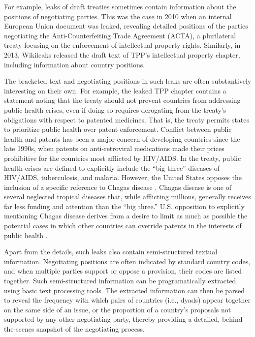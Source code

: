 \documentclass[12pt]{article}
\begin{document}
For example, leaks of draft treaties sometimes contain information about the positions 
of negotiating parties. This was the case in 2010 when an internal European Union document was 
leaked, revealing detailed positions of the parties negotiating the Anti-Counterfeiting 
Trade Agreement (ACTA), a plurilateral treaty focusing on the enforcement of intellectual property 
rights. Similarly, in 2013, Wikileaks released the draft text of TPP's intellectual property chapter, 
including information about country positions.

The bracketed text and negotiating positions in such leaks are often substantively interesting on 
their own. For example, the leaked TPP chapter contains a statement noting that the treaty should 
not prevent countries from addressing public health crises, even if doing so requires derogating from 
the treaty's obligations with respect to patented medicines. That is, the treaty permits states to 
prioritize public health over patent enforcement. Conflict between public health and patents has been 
a major concern of developing countries since the late 1990s, when patents on anti-retroviral medications 
made their prices prohibitive for the countries most afflicted by HIV/AIDS.
In the treaty, public health crises are defined to 
explicitly include the ``big three'' diseases of HIV/AIDS, tuberculosis, and malaria. 
However, the United States opposes the inclusion of a specific reference to Chagas disease \citep[Art. QQ.A.5(a)]{wikileaks2013wikileaks}. 
Chagas disease is one of several neglected tropical diseases that, while afflicting millions, 
generally receives far less funding and attention than the ``big three.'' U.S. opposition to 
explicitly mentioning Chagas disease derives from a desire to limit as much as possible 
the potential cases in which other countries can override patents in the interests of public 
health \citep[11]{government_accountability_office2007intellectual}.

Apart from the details, such leaks also contain semi-structured textual information. 
Negotiating positions are often indicated by standard country codes, and when multiple parties 
support or oppose a provision, their codes are listed together. Such semi-structured information 
can be programatically extracted using basic text processing tools. 
The extracted information can then be 
parsed to reveal the frequency with which pairs of countries (i.e., dyads) appear together on the same 
side of an issue, 
or the proportion of a country's proposals not supported by any other negotiating party, thereby 
providing a detailed, behind-the-scenes snapshot of the negotiating process.
\end{document}
